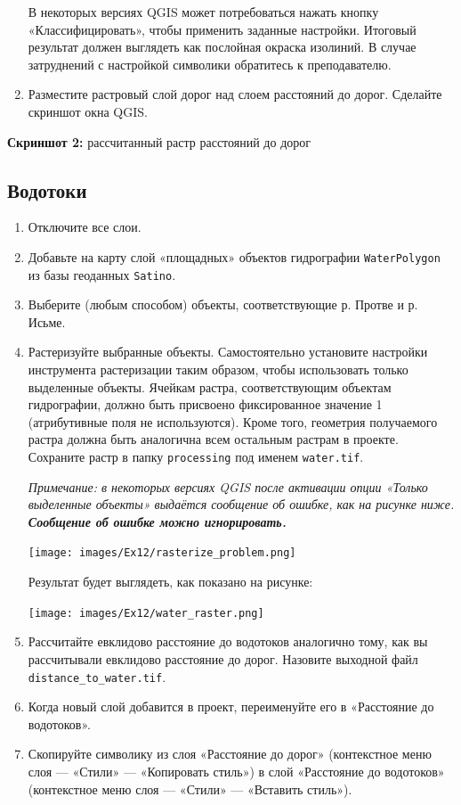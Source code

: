 \documentclass[
  12pt,
]{book}
\begin{document}
\begin{enumerate}
  В некоторых версиях QGIS может потребоваться нажать кнопку «Классифицировать», чтобы применить заданные настройки. Итоговый результат должен выглядеть как послойная окраска изолиний. В случае затруднений с настройкой символики обратитесь к преподавателю.
\item
  Разместите растровый слой дорог над слоем расстояний до дорог. Сделайте скриншот окна QGIS.
\end{enumerate}

\textbf{Скриншот 2:} рассчитанный растр расстояний до дорог

\hypertarget{weighted-overlay-streams}{%
\subsection{Водотоки}\label{weighted-overlay-streams}}

\begin{enumerate}
\def\labelenumi{\arabic{enumi}.}
\item
  Отключите все слои.
\item
  Добавьте на карту слой «площадных» объектов гидрографии \texttt{WaterPolygon} из базы геоданных \texttt{Satino}.
\item
  Выберите (любым способом) объекты, соответствующие р. Протве и р. Исьме.
\item
  Растеризуйте выбранные объекты. Самостоятельно установите настройки инструмента растеризации таким образом, чтобы использовать только выделенные объекты. Ячейкам растра, соответствующим объектам гидрографии, должно быть присвоено фиксированное значение 1 (атрибутивные поля не используются). Кроме того, геометрия получаемого растра должна быть аналогична всем остальным растрам в проекте. Сохраните растр в папку \texttt{processing} под именем \texttt{water.tif}.

  \emph{Примечание: в некоторых версиях QGIS после активации опции «Только выделенные объекты» выдаётся сообщение об ошибке, как на рисунке ниже. \textbf{Сообщение об ошибке можно игнорировать.}}

  \texttt{[image: images/Ex12/rasterize\_problem.png]}

  Результат будет выглядеть, как показано на рисунке:

  \texttt{[image: images/Ex12/water\_raster.png]}
\item
  Рассчитайте евклидово расстояние до водотоков аналогично тому, как вы рассчитывали евклидово расстояние до дорог. Назовите выходной файл \texttt{distance\_to\_water.tif}.
\item
  Когда новый слой добавится в проект, переименуйте его в «Расстояние до водотоков».
\item
  Скопируйте символику из слоя «Расстояние до дорог» (контекстное меню слоя --- «Стили» --- «Копировать стиль») в слой «Расстояние до водотоков» (контекстное меню слоя --- «Стили» --- «Вставить стиль»).
\end{enumerate}
\end{document}
